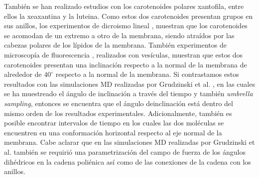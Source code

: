 Tambi\'{e}n se han realizado estudios con los carotenoides polares xantofila, entre ellos la xeaxantina y la luteina. Como estos  dos carotenoides presentan grupos  en sus anillos, los experimentos de dicroismo lineal \cite{Gruszecki2004CarotenoidsProperties}, muestran que los carotenoides se acomodan de un extremo a otro de la membrana, siendo atra\'{i}dos por las cabezas polares de los l\'{i}pidos de la membrana. Tambi\'{e}n experimentos de microscop\'{i}a de fluorescencia \cite{Grudzinski2017LocalizationBilayer}, realizados con ves\'{i}culas, muestran que estos dos carotenoides presentan una inclinaci\'{o}n respecto a la normal de la membrana de alrededor de $40
^{\circ}$ respecto a la normal de la membrana. Si contrastamos estos resultados con las simulaciones MD realizadas por Grudzinski et al. \cite{Grudzinski2017LocalizationBilayer}, en las cuales se ha muestreado el \'{a}ngulo de inclinaci\'{o}n a trav\'{e}s del tiempo y tambi\'{e}n  \textit{umbrella sampling}, entonces se encuentra que el \'{a}ngulo deinclinaci\'{o}n est\'{a} dentro del mismo orden de los resultados experimentales. Adicionalmente, tambi\'{e}n es posible encontrar intervalos de tiempo en los cuales las dos mol\'{e}culas se encuentren en una conformaci\'{o}n horizontal respecto al eje normal de la membrana. Cabe aclarar que en las simulaciones MD realizadas por Grudzinski et al. \cite{Grudzinski2017LocalizationBilayer} tambi\'{e}n se requiri\'{o} una parametrizaci\'{o}n del campo de fuerza de los \'{a}ngulos dih\'{e}dricos en la cadena poli\'{e}nica as\'{i} como de las conexiones de la cadena con los anillos.\\
